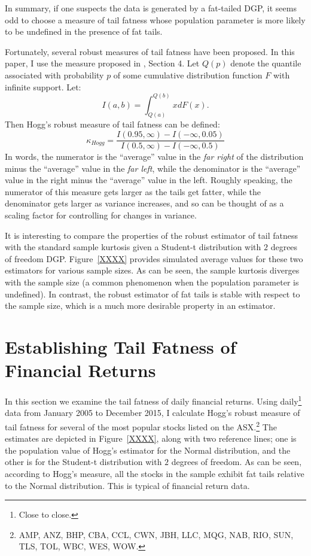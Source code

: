 \documentclass[12pt,a4paper]{amsart}
\renewcommand{\k}{\kappa}
\newcommand{\can}{\citeasnoun}							%
\begin{document}
In summary, if one suspects the data is generated by a fat-tailed DGP, it seems odd to choose a measure of tail fatness whose population parameter is more likely to be undefined in the presence of fat tails.

Fortunately, several robust measures of tail fatness have been proposed. In this paper, I use the measure proposed in \can{Hogg_(1974)}, Section 4. Let $Q(p)$ denote the quantile associated with probability $p$ of some cumulative distribution function $F$ with infinite support. Let:
\begin{equation}
I(a, b) = \int_{Q(a)}^{Q(b)} x dF(x) .
\end{equation}
Then Hogg's robust measure of tail fatness can be defined:
\begin{equation}
\k_{Hogg} = \frac{I(0.95, \infty) - I(-\infty, 0.05)}{I(0.5, \infty) - I(-\infty, 0.5)}
\end{equation}
In words, the numerator is the ``average'' value in the \emph{far right} of the distribution minus the ``average'' value in the \emph{far left}, while the denominator is the ``average'' value in the right minus the ``average'' value in the left. Roughly speaking, the numerator of this measure gets larger as the tails get fatter, while the denominator gets larger as variance increases, and so can be thought of as a scaling factor for controlling for changes in variance.

It is interesting to compare the properties of the robust estimator of tail fatness with the standard sample kurtosis given a Student-t distribution with $2$ degrees of freedom DGP. Figure~\ref{XXXX} provides simulated average values for these two estimators for various sample sizes. As can be seen, the sample kurtosis diverges with the sample size (a common phenomenon when the population parameter is undefined). In contrast, the robust estimator of fat tails is stable with respect to the sample size, which is a much more desirable property in an estimator.



\section{Establishing Tail Fatness of Financial Returns}\label{secFinReturnTailFatness}

In this section we examine the tail fatness of daily financial returns. Using daily\footnote{Close to close.} data from January 2005 to December 2015, I calculate Hogg's robust measure of tail fatness for several of the most popular stocks listed on the ASX.\footnote{AMP, ANZ, BHP, CBA, CCL, CWN, JBH, LLC, MQG, NAB, RIO, SUN, TLS, TOL, WBC, WES, WOW.} The estimates are depicted in Figure~\ref{XXXX}, along with two reference lines; one is the population value of Hogg's estimator for the Normal distribution, and the other is for the Student-t distribution with $2$ degrees of freedom. As can be seen, according to Hogg's measure, all the stocks in the sample exhibit fat tails relative to the Normal distribution. This is typical of financial return data.
\end{document}
